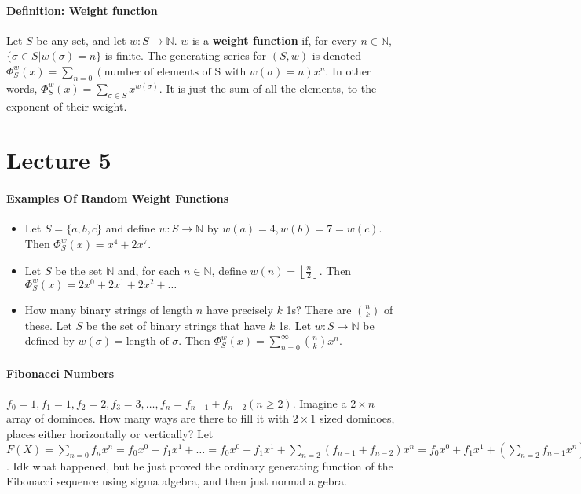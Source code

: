 \documentclass[10pt,letter]{article}
\begin{document}
\paragraph{Definition: Weight function} Let $S$ be any set, and let $w:S\rightarrow\mathbb{N}$. $w$ is a \textbf{weight function} if, for every $n\in\mathbb{N}$, $\{\sigma\in S|w(\sigma)=n\}$ is finite. The generating series for $(S,w)$ is denoted $\Phi_S^w(x)=\sum_{n=0}(\text{number of elements of S with }w(\sigma)=n)x^n$. In other words, $\Phi_S^w(x)=\sum_{\sigma\in S}x^{w(\sigma)}$. It is just the sum of all the elements, to the exponent of their weight. 

\section*{Lecture 5}
\paragraph{Examples Of Random Weight Functions}
\begin{itemize}
    \item Let $S=\{a,b,c\}$ and define $w:S\rightarrow\mathbb{N}$ by $w(a)=4,w(b)=7=w(c)$. Then $\Phi_S^w(x)=x^4+2x^7$. 
    \item Let $S$ be the set $\mathbb{N}$ and, for each $n\in\mathbb{N}$, define $w(n)=\left\lfloor\frac{n}{2}\right\rfloor$. Then $\Phi_S^w(x)=2x^0+2x^1+2x^2+\ldots$
    \item How many binary strings of length $n$ have precisely $k$ 1s? There are ${n\choose k}$ of these. Let $S$ be the set of binary strings that have $k$ 1s. Let $w:S\rightarrow\mathbb{N}$ be defined by $w(\sigma)=\text{length of }\sigma$. Then $\Phi_S^w(x)=\sum_{n=0}^\infty{n\choose k}x^n$. 
\end{itemize}

\paragraph{Fibonacci Numbers} $f_0=1, f_1=1, f_2=2,f_3=3,\ldots,f_n=f_{n-1}+f_{n-2}(n\geq2)$. Imagine a $2\times n$ array of dominoes. How many ways are there to fill it with $2\times 1$ sized dominoes, places either horizontally or vertically? Let $F(X)=\sum_{n=0}f_nx^n=f_0x^0+f_1x^1+\ldots=f_0x^0+f_1x^1+\sum_{n=2}(f_{n-1}+f_{n-2})x^n=f_0x^0+f_1x^1+(\sum_{n=2}f_{n-1}x^n)+(\sum_{n=2}f_{n-2}x^n)$. Idk what happened, but he just proved the ordinary generating function of the Fibonacci sequence using sigma algebra, and then just normal algebra. 
\end{document}
